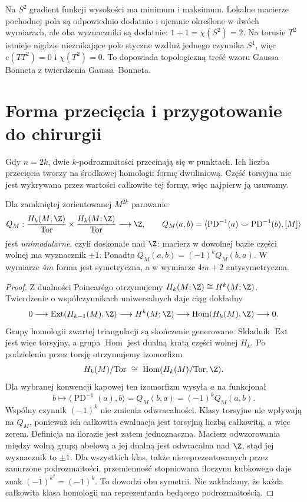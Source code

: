 \begin{przyklad}
Na $S^2$ gradient
funkcji wysokości
ma minimum i maksimum.
Lokalne macierze
pochodnej pola są
odpowiednio dodatnio
i ujemnie określone
w dwóch wymiarach,
ale oba wyznaczniki
są dodatnie:
$1+1=\chi(S^2)=2$.
Na torusie $T^2$
istnieje nigdzie
nieznikające pole
styczne wzdłuż
jednego czynnika
$S^1$, więc
$e(TT^2)=0$ i
$\chi(T^2)=0$.
To dopowiada topologiczną
treść wzoru
Gaussa--Bonneta z twierdzenia Gaussa--Bonneta.
\end{przyklad}

\section{Forma przecięcia i przygotowanie do chirurgii}
\label{sec:forma-przeciecia-16}

Gdy $n=2k$, dwie
$k$-podrozmaitości
przecinają się
w punktach.
Ich liczba przecięcia
tworzy na środkowej
homologii formę
dwuliniową. Część
torsyjna nie jest
wykrywana przez
wartości całkowite
tej formy, więc
najpierw ją usuwamy.

\begin{twierdzenie}
\label{thm:forma-przeciecia-16}
Dla zamkniętej
zorientowanej
$M^{2k}$ parowanie
\[
 Q_M:
 \frac{H_k(M;\Z)}{\mathrm{Tor}}
 \times
 \frac{H_k(M;\Z)}{\mathrm{Tor}}
   \longrightarrow\Z,
 \qquad
 Q_M(a,b)=
 \langle\operatorname{PD}^{-1}(a)
 \smile\operatorname{PD}^{-1}(b),[M]\rangle
\]
jest \emph{unimodularne}, czyli doskonałe nad $\Z$:
macierz w dowolnej bazie
części wolnej ma wyznacznik
$\pm1$. Ponadto
$Q_M(a,b)=(-1)^kQ_M(b,a)$.
W wymiarze $4m$ forma
jest symetryczna, a
w wymiarze $4m+2$
antysymetryczna.
\end{twierdzenie}
\begin{proof}
Z dualności Poincarégo
otrzymujemy
$H_k(M;\Z)\cong H^k(M;\Z)$.
Twierdzenie o
współczynnikach
uniwersalnych daje
ciąg dokładny
\[
0\longrightarrow
 \operatorname{Ext}
     (H_{k-1}(M),\Z)
 \longrightarrow H^k(M;\Z)
 \longrightarrow
 \operatorname{Hom}(H_k(M),\Z)
 \longrightarrow0.
\]
Grupy homologii
zwartej triangulacji
są skończenie
generowane.
Składnik $\operatorname{Ext}$
jest więc torsyjny,
a grupa $\operatorname{Hom}$
jest dualną kratą
części wolnej $H_k$.
Po podzieleniu przez
torsję otrzymujemy
izomorfizm
\[
 H_k(M)/\mathrm{Tor}
 \ \cong\
 \operatorname{Hom}
    (H_k(M)/\mathrm{Tor},\Z).
\]
Dla wybranej konwencji kapowej ten izomorfizm
wysyła $a$ na funkcjonał
\[
 b\longmapsto\langle\operatorname{PD}^{-1}(a),b\rangle
 =Q_M(b,a)=(-1)^kQ_M(a,b).
\]
Wspólny czynnik $(-1)^k$ nie zmienia odwracalności.
Klasy torsyjne nie wpływają na $Q_M$, ponieważ
ich całkowita ewaluacja jest torsyjną liczbą całkowitą,
a więc zerem. Definicja na ilorazie jest zatem jednoznaczna.
Macierz odwzorowania
między wolną grupą
abelową a jej dualną
jest odwracalna nad
$\Z$, stąd jej
wyznacznik to $\pm1$.
Dla wszystkich klas, także niereprezentowanych
przez zanurzone podrozmaitości, przemienność
stopniowana iloczynu kubkowego daje znak
$(-1)^{k^2}=(-1)^k$. To dowodzi obu symetrii.
Nie zakładamy, że każda całkowita klasa homologii
ma reprezentanta będącego podrozmaitością.
\end{proof}

